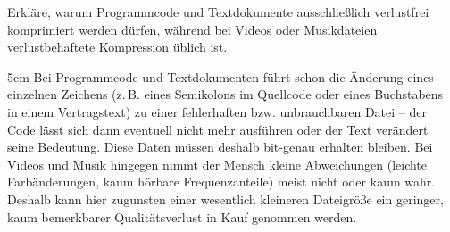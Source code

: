 
\question[3]
Erkläre, warum Programmcode und Textdokumente ausschließlich verlustfrei 
komprimiert werden dürfen, während bei Videos oder Musikdateien verlustbehaftete 
Kompression üblich ist.

\begin{solutionbox}{5cm}
Bei Programmcode und Textdokumenten führt schon die Änderung eines einzelnen Zeichens
(z.\,B. eines Semikolons im Quellcode oder eines Buchstabens in einem Vertragstext) 
zu einer fehlerhaften bzw. unbrauchbaren Datei -- der Code lässt sich dann eventuell
nicht mehr ausführen oder der Text verändert seine Bedeutung. Diese Daten müssen deshalb
bit-genau erhalten bleiben.
Bei Videos und Musik hingegen nimmt der Mensch kleine Abweichungen 
(leichte Farbänderungen, kaum hörbare Frequenzanteile) meist nicht oder kaum wahr.
Deshalb kann hier zugunsten einer wesentlich kleineren Dateigröße ein geringer, 
kaum bemerkbarer Qualitätsverlust in Kauf genommen werden.
\end{solutionbox}